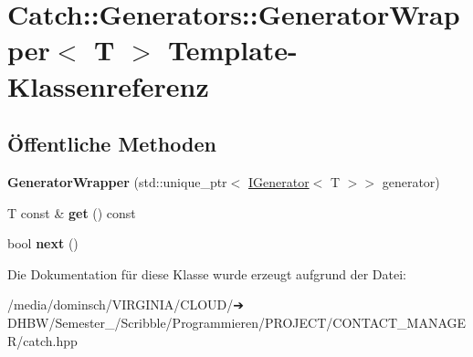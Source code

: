 \hypertarget{classCatch_1_1Generators_1_1GeneratorWrapper}{}\section{Catch\+:\+:Generators\+:\+:Generator\+Wrapper$<$ T $>$ Template-\/\+Klassenreferenz}
\label{classCatch_1_1Generators_1_1GeneratorWrapper}
\subsection*{Öffentliche Methoden}
\begin{DoxyCompactItemize}
\item 
\mbox{\label{classCatch_1_1Generators_1_1GeneratorWrapper_aecffeafd4fd38d91a52dadf28b6e2b29}} 
{\bfseries Generator\+Wrapper} (std\+::unique\+\_\+ptr$<$ \hyperlink{structCatch_1_1Generators_1_1IGenerator}{I\+Generator}$<$ T $>$$>$ generator)
\item 
\mbox{\label{classCatch_1_1Generators_1_1GeneratorWrapper_a271f0f905f2c473c907550435b81e102}} 
T const  \& {\bfseries get} () const
\item 
\mbox{\label{classCatch_1_1Generators_1_1GeneratorWrapper_acbfdca94811ae02461bd2cf5f60b666e}} 
bool {\bfseries next} ()
\end{DoxyCompactItemize}


Die Dokumentation für diese Klasse wurde erzeugt aufgrund der Datei\+:\begin{DoxyCompactItemize}
\item 
/media/dominsch/\+V\+I\+R\+G\+I\+N\+I\+A/\+C\+L\+O\+U\+D/➔ D\+H\+B\+W/\+Semester\+\_/\+Scribble/\+Programmieren/\+P\+R\+O\+J\+E\+C\+T/\+C\+O\+N\+T\+A\+C\+T\+\_\+\+M\+A\+N\+A\+G\+E\+R/catch.\+hpp\end{DoxyCompactItemize}
